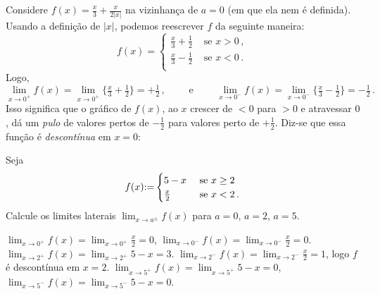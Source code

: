 \begin{ex}\label{Ex:funcaodescontinua}
Considere $f(x)=\tfrac{x}{3}+\frac{x}{2|x|}$ na vizinhança de $a=0$ (em que ela
nem é definida).
Usando a definição de $|x|$, podemos reescrever $f$ da seguinte maneira:
\[ f(x)=
\begin{cases}
\tfrac{x}{3}+\tfrac12&\text{ se }x>0\,,\\
\tfrac{x}{3}-\tfrac12&\text{ se }x<0\,.\\
\end{cases}
\]
Logo,
$$
\lim_{x\to 0^+}f(x)=
\lim_{x\to 0^+}\bigl\{ \tfrac{x}{3}+\tfrac12 \bigr\}=
+\tfrac12\,,\quad \quad 
\text{ e }
\quad
\quad
\lim_{x\to 0^-}f(x)=
\lim_{x\to 0^-}\bigl\{ \tfrac{x}{3}-\tfrac12 \bigr\}=
-\tfrac12\,.
$$
 Isso significa que o gráfico de $f(x)$, ao $x$ crescer de $<0$ para $>0$ e atravessar
$0$, dá um \emph{pulo} de valores pertos de $-\tfrac12$ para valores perto de $+\tfrac12$.
Diz-se que essa função é \emph{descontínua} em $x=0$:
\begin{center}
\begin{bmlimage}\end{bmlimage}
\end{center}
\end{ex}

\begin{exo}
Seja
$$f(x){:=}
\begin{cases}
5-x&\text{ se }x\geq 2\\
\frac{x}{2}&\text{ se }x< 2\,.
\end{cases}$$
Calcule os limites laterais $\lim_{x\to a^{\pm}}f(x)$ para $a=0$, $a=2$, $a=5$.
\begin{sol}
$\lim_{x\to 0^+}f(x)=\lim_{x\to 0^+}\frac{x}{2}=0$,
$\lim_{x\to 0^-}f(x)=\lim_{x\to 0^-}\frac{x}{2}=0$.
$\lim_{x\to 2^+}f(x)=\lim_{x\to 2^+}5-x=3$.
$\lim_{x\to 2^-}f(x)=\lim_{x\to 2^-}\frac{x}{2}=1$, logo $f$ é descontínua em
$x=2$.
$\lim_{x\to 5^+}f(x)=\lim_{x\to 5^+}5-x=0$,
$\lim_{x\to 5^-}f(x)=\lim_{x\to 5^-}5-x=0$.
\end{sol}
\end{exo}

